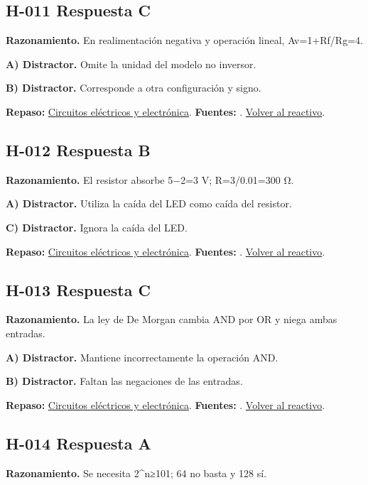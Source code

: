 \subsection*{H-011 \quad Respuesta C}\label{s:H-011}
\textbf{Razonamiento.} En realimentación negativa y operación lineal, Av=1+Rf/Rg=4.

\textbf{A) Distractor. }Omite la unidad del modelo no inversor.

\textbf{B) Distractor. }Corresponde a otra configuración y signo.

\textbf{Repaso:} \hyperref[sec:h1]{Circuitos eléctricos y electrónica}. \textbf{Fuentes:} \cite{openstax,electronics,digital}. \hyperref[q:H-011]{Volver al reactivo}.\par\medskip

\subsection*{H-012 \quad Respuesta B}\label{s:H-012}
\textbf{Razonamiento.} El resistor absorbe 5−2=3 V; R=3/0.01=300 Ω.

\textbf{A) Distractor. }Utiliza la caída del LED como caída del resistor.

\textbf{C) Distractor. }Ignora la caída del LED.

\textbf{Repaso:} \hyperref[sec:h1]{Circuitos eléctricos y electrónica}. \textbf{Fuentes:} \cite{openstax,electronics,digital}. \hyperref[q:H-012]{Volver al reactivo}.\par\medskip

\subsection*{H-013 \quad Respuesta C}\label{s:H-013}
\textbf{Razonamiento.} La ley de De Morgan cambia AND por OR y niega ambas entradas.

\textbf{A) Distractor. }Mantiene incorrectamente la operación AND.

\textbf{B) Distractor. }Faltan las negaciones de las entradas.

\textbf{Repaso:} \hyperref[sec:h1]{Circuitos eléctricos y electrónica}. \textbf{Fuentes:} \cite{openstax,electronics,digital}. \hyperref[q:H-013]{Volver al reactivo}.\par\medskip

\subsection*{H-014 \quad Respuesta A}\label{s:H-014}
\textbf{Razonamiento.} Se necesita 2\textasciicircum{}n≥101; 64 no basta y 128 sí.

